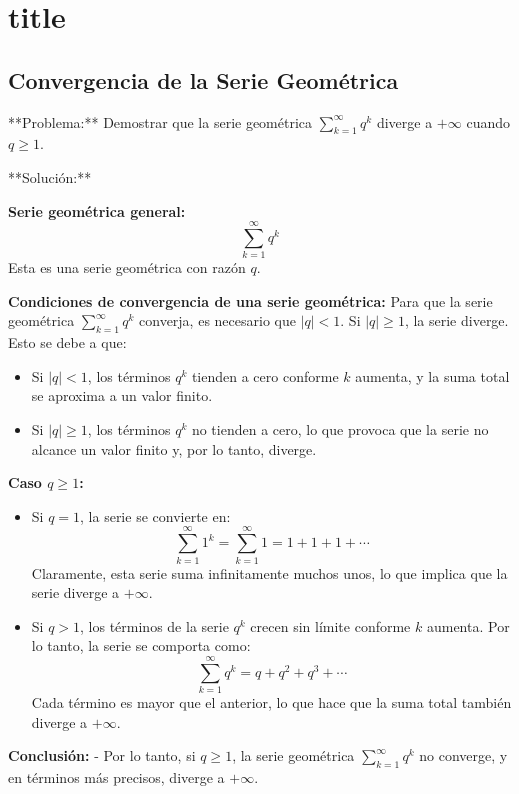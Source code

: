 \chapter*{title}
\section{Convergencia de la Serie Geométrica}

    **Problema:**
    Demostrar que la serie geométrica $\sum_{k=1}^{\infty} q^k$ diverge a $+\infty$ cuando $q \geq 1$.

    **Solución:**

    \textbf{Serie geométrica general:}
    \[
    \sum_{k=1}^{\infty} q^k
    \]
    Esta es una serie geométrica con razón \( q \).
 
    \textbf{Condiciones de convergencia de una serie geométrica:}
    Para que la serie geométrica \(\sum_{k=1}^{\infty} q^k\) converja, es necesario que \( |q| < 1 \). Si \( |q| \geq 1 \), la serie diverge. Esto se debe a que:
    \begin{itemize}
    \item Si \( |q| < 1 \), los términos \( q^k \) tienden a cero conforme \( k \) aumenta, y la suma total se aproxima a un valor finito.
    \item Si \( |q| \geq 1 \), los términos \( q^k \) no tienden a cero, lo que provoca que la serie no alcance un valor finito y, por lo tanto, diverge.
    \end{itemize}
 
    \textbf{Caso \( q \geq 1 \):}
    \begin{itemize}
    \item Si \( q = 1 \), la serie se convierte en:
      \[
      \sum_{k=1}^{\infty} 1^k = \sum_{k=1}^{\infty} 1 = 1 + 1 + 1 + \cdots
      \]
      Claramente, esta serie suma infinitamente muchos unos, lo que implica que la serie diverge a \( +\infty \).
    \item Si \( q > 1 \), los términos de la serie \( q^k \) crecen sin límite conforme \( k \) aumenta. Por lo tanto, la serie se comporta como:
      \[
      \sum_{k=1}^{\infty} q^k = q + q^2 + q^3 + \cdots
      \]
      Cada término es mayor que el anterior, lo que hace que la suma total también diverge a \( +\infty \).
    \end{itemize}
 
 \textbf{Conclusión:}
 - Por lo tanto, si \( q \geq 1 \), la serie geométrica \(\sum_{k=1}^{\infty} q^k\) no converge, y en términos más precisos, diverge a \( +\infty \).
 
